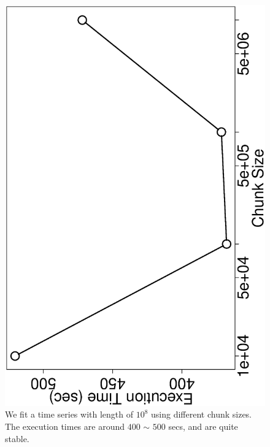 \documentclass[english,10pt]{llncs}
\begin{document}
\begin{figure}[ht]
  \begin{centering}
    \includegraphics[angle=-90,scale=0.4]{1e8_time_vs_chunksize}
  \end{centering}
  \caption{\label{fig:chunksize_effect} We fit a time series with
    length of $10^8$ using different chunk sizes. The execution times
    are around $400$ $\sim$ $500$ secs, and are quite stable. }
\end{figure}
\end{document}
